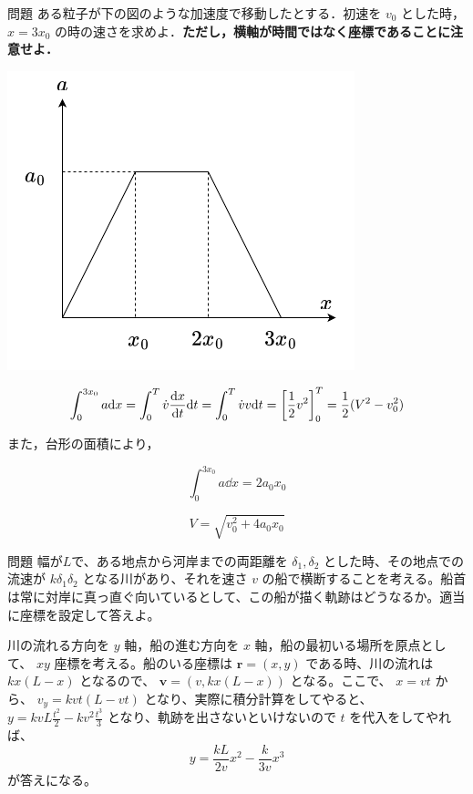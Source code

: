 \documentclass[
  b4paperpaper,
  xelatex,ja=standard]{bxjsbook}
\begin{document}
\begin{Qbox}{問題}
ある粒子が下の図のような加速度で移動したとする．初速を \(v_0\)
とした時， \(x=3x_0\)
の時の速さを求めよ．\textbf{ただし，横軸が時間ではなく座標であることに注意せよ．}

\includegraphics{source/images/velocity/mondai1-re.png}

\end{Qbox}


\[\int_{0}^{3x_0}a\dd x=\int_{0}^{T}\dot{v}\dv{x}{t}\dd t = \int_{0}^{T}\dot{v}v\dd t=\left[\frac{1}{2}v^2\right]_{0}^{T}=\frac{1}{2}(V^2-v_0^2)\]

また，台形の面積により，

\[\int_{0}^{3x_0}a\dd x = 2a_0x_0\]

\[V=\sqrt{v_0^2+4a_0x_0}\]

\begin{Qbox}{問題}
幅が\(L\)で、ある地点から河岸までの両距離を \(\delta_1,\delta_2\)
とした時、その地点での流速が \(k\delta_1\delta_2\)
となる川があり、それを速さ \(v\)
の船で横断することを考える。船首は常に対岸に真っ直ぐ向いているとして、この船が描く軌跡はどうなるか。適当に座標を設定して答えよ。

\end{Qbox}


川の流れる方向を \(y\) 軸，船の進む方向を \(x\)
軸，船の最初いる場所を原点として、 \(xy\) 座標を考える。船のいる座標は
\(\boldsymbol{r}=(x,y)\) である時、川の流れは \(kx(L-x)\) となるので、
\(\boldsymbol{v}=(v,kx(L-x))\) となる。ここで、 \(x=vt\) から、
\(v_y=kvt(L-vt)\) となり、実際に積分計算をしてやると、
\(y=kvL\frac{t^2}{2}-kv^2\frac{t^3}{3}\)
となり、軌跡を出さないといけないので \(t\) を代入をしてやれば、
\[y=\frac{kL}{2v}x^2-\frac{k}{3v}x^3\] が答えになる。
\end{document}
